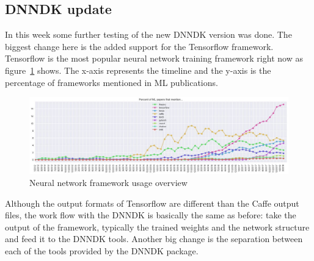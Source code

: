 \subsection{\acs{DNNDK} update}
In this week some further testing of the new \ac{DNNDK} version was done. The biggest change here is the added support for the Tensorflow framework. Tensorflow is the most popular neural network training framework right now as figure~\ref{fig:nnframeworks} shows. The x-axis represents the timeline and the y-axis is the percentage of frameworks mentioned in \ac{ML} publications.
\begin{figure}[!htb]
	\centering
		\includegraphics[width=\textwidth]{bilder/nnframeworks.jpg}
		\caption{Neural network framework usage overview \cite{frameworks}}
		\label{fig:nnframeworks}
\end{figure}
Although the output formats of Tensorflow are different than the Caffe output files, the work flow with the \ac{DNNDK} is basically the same as before: take the output of the framework, typically the trained weights and the network structure and feed it to the \ac{DNNDK} tools. Another big change is the separation between each of the tools provided by the \ac{DNNDK} package.
